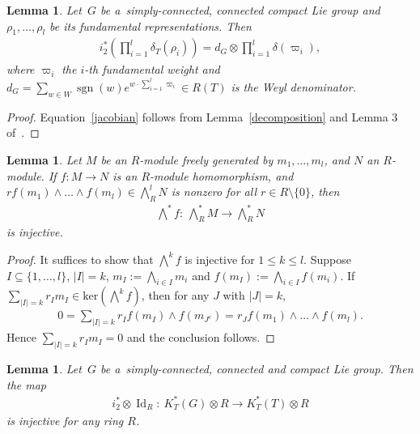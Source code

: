 \documentclass[11pt]{article}
\numberwithin{equation}{section}
\newtheorem{Lemma}[Theorem]{Lemma}
\DeclareMathOperator{\Id}{Id}
\begin{document}
\begin{Lemma}
\label{Atiyahindex}
Let~$G$ be a~simply-connected, connected compact Lie group and $\rho_1, \dots, \rho_l$ be its fundamental
representations.
Then
\begin{gather}
\label{jacobian}
i_2^*\left(\prod\limits_{i=1}^l\delta_T(\rho_i)\right)=d_G\otimes\prod\limits_{i=1}^l\delta(\varpi_i),
\end{gather}
where $\varpi_i$ the $i$-th fundamental weight and $d_G=
\sum\limits_{w\in W}
\operatorname{sgn}(w)e^{w\cdot
\sum\limits_{i=1}^l\varpi_i}\in R(T)$ is the Weyl deno\-mi\-nator.
\end{Lemma}
\begin{proof}
Equation~\eqref{jacobian} follows from Lemma~\ref{decomposition} and Lemma 3 of~\cite{At2}.
\end{proof}
\begin{Lemma}
\label{wedgeinj}
Let $M$ be an $R$-module freely generated by $m_1, \dots, m_l$, and $N$ an $R$-module.
If $f: M\to N$ is an $R$-module homomorphism, and $rf(m_1)\wedge\dots\wedge f(m_l)\in \bigwedge_R^l N$ is nonzero for
all $r\in R
\setminus\{0\}$, then
\begin{gather*}
\bigwedge\nolimits^* f: \ \bigwedge\nolimits_R^*M\to \bigwedge\nolimits_R^*N
\end{gather*}
is injective.
\end{Lemma}
\begin{proof}
It suf\/f\/ices to show that $\bigwedge^k f$ is injective for $1\leq k\leq l$.
Suppose $I
\subseteq\{1, \dots, l\}$, $|I|=k$, $m_I:=\bigwedge_{i\in I}m_i$ and $f(m_I):=\bigwedge_{i\in I}f(m_i)$.
If $\sum\limits_{|I|=k}
r_Im_I\in\text{ker}(\bigwedge^k f)$, then for any $J$ with $|J|=k$,
\begin{gather*}
0=
\sum\limits_{|I|=k}
r_If(m_I)\wedge f(m_{J^c})=r_Jf(m_1)\wedge\dots\wedge f(m_l).
\end{gather*}
Hence $\sum\limits_{|I|=k}
r_Im_I=0$ and the conclusion follows.
\end{proof}
\begin{Lemma}
\label{twotorsioninj}
Let~$G$ be a~simply-connected, connected and compact Lie group.
Then the map
\begin{gather*}
i_2^*\otimes\Id_R: \ K_T^*(G)\otimes R\to K_T^*(T)\otimes R
\end{gather*}
is injective for any ring $R$.
\end{Lemma}
\end{document}
